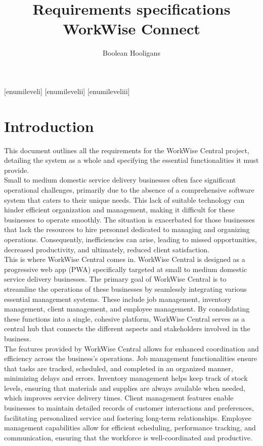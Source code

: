 \documentclass{article}
\title{%
	Requirements specifications \\
	\large WorkWise Connect}
\author{Boolean Hooligans}
\begin{document}
	
	[enumileveli]
	[enumilevelii]
	[enumileveliii]
	
	
	
	\maketitle
	\newpage
	
	\section*{Introduction}	
	
	This document outlines all the requirements for the WorkWise Central project, detailing the system as a whole and specifying the essential functionalities it must provide.\\
	
	Small to medium domestic service delivery businesses often face significant operational challenges, primarily due to the absence of a comprehensive software system that caters to their unique needs. This lack of suitable technology can hinder efficient organization and management, making it difficult for these businesses to operate smoothly. The situation is exacerbated for those businesses that lack the resources to hire personnel dedicated to managing and organizing operations. Consequently, inefficiencies can arise, leading to missed opportunities, decreased productivity, and ultimately, reduced client satisfaction.\\
	
	This is where WorkWise Central comes in. WorkWise Central is designed as a progressive web app (PWA) specifically targeted at small to medium domestic service delivery businesses. The primary goal of WorkWise Central is to streamline the operations of these businesses by seamlessly integrating various essential management systems. These include job management, inventory management, client management, and employee management. By consolidating these functions into a single, cohesive platform, WorkWise Central serves as a central hub that connects the different aspects and stakeholders involved in the business.\\
	
	The features provided by WorkWise Central allows for enhanced coordination and efficiency across the business’s operations. Job management functionalities ensure that tasks are tracked, scheduled, and completed in an organized manner, minimizing delays and errors. Inventory management helps keep track of stock levels, ensuring that materials and supplies are always available when needed, which improves service delivery times. Client management features enable businesses to maintain detailed records of customer interactions and preferences, facilitating personalized service and fostering long-term relationships. Employee management capabilities allow for efficient scheduling, performance tracking, and communication, ensuring that the workforce is well-coordinated and productive.\\
	
\end{document}
